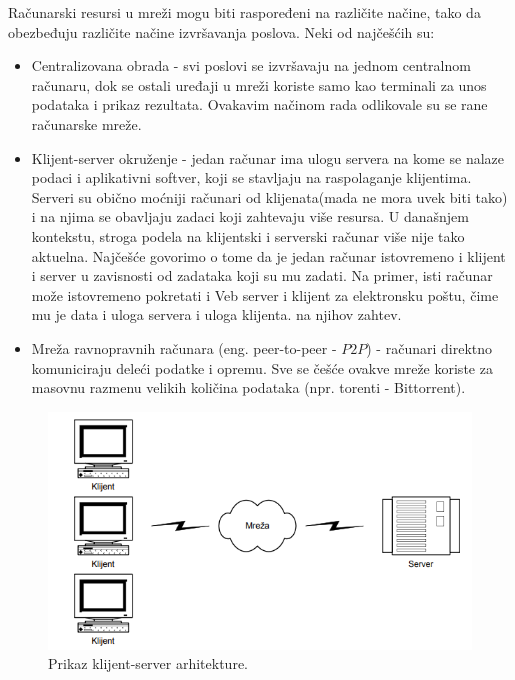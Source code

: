 \documentclass[a4paper]{article}
\begin{document}
Računarski resursi u mreži mogu biti raspoređeni na različite načine, tako da obezbeđuju različite načine izvršavanja poslova. Neki od najčešćih su:
\begin{itemize}
\item Centralizovana obrada - svi poslovi se izvršavaju na jednom centralnom računaru, dok se ostali uređaji u mreži koriste samo kao terminali za unos podataka i prikaz rezultata. Ovakavim načinom rada odlikovale su se rane računarske mreže.
\item Klijent-server okruženje - jedan računar ima ulogu servera na kome se nalaze
podaci i aplikativni softver, koji se stavljaju na raspolaganje klijentima. Serveri su obično moćniji računari od klijenata(mada ne mora uvek biti tako) i na njima se obavljaju zadaci koji zahtevaju više resursa. U današnjem kontekstu, stroga podela na klijentski i serverski računar više nije tako aktuelna. Najčešće govorimo o tome da je jedan računar istovremeno i klijent i server u zavisnosti od zadataka koji su mu zadati. Na primer, isti računar može istovremeno pokretati i Veb server i klijent za elektronsku poštu, čime mu je data i uloga servera i uloga klijenta.
na njihov zahtev. 
\item Mreža ravnopravnih računara (eng. peer-to-peer - $P2P$) - računari direktno komuniciraju deleći podatke i opremu. Sve se češće ovakve mreže koriste za masovnu razmenu velikih količina podataka (npr. torenti - Bittorrent).
\end{itemize}
\begin{figure}[h!]
\begin{center}
\includegraphics[scale=0.5]{pictures/KS.png}
\end{center}
\caption{Prikaz klijent-server arhitekture.}
\label{fig:KS}
\end{figure}
\end{document}
